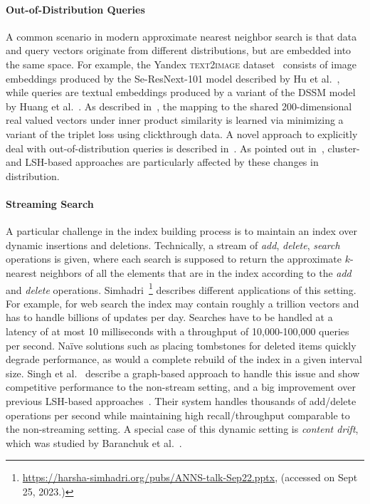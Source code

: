 \documentclass[11pt]{article}
\begin{document}
\paragraph{Out-of-Distribution Queries}
A common scenario in modern approximate nearest neighbor search is that data and query vectors originate from different distributions, but are embedded into the same space.
For example, the Yandex \textsc{text2image} dataset~\cite{DBLP:conf/nips/SimhadriWADBBCH21} consists of image embeddings produced by the Se-ResNext-101 model described by Hu et al.~\cite{DBLP:conf/cvpr/HuSS18}, while queries are textual embeddings produced by a variant of the DSSM model by Huang et al.~\cite{DBLP:conf/cikm/HuangHGDAH13}.
As described in~\cite{DBLP:conf/nips/SimhadriWADBBCH21}, the mapping to the shared 200-dimensional real valued vectors under inner product similarity is learned via minimizing a variant of the triplet loss using clickthrough data.
A novel approach to explicitly deal with out-of-distribution queries is described in~\cite{DBLP:journals/corr/abs-2211-12850-ood}.
As pointed out in~\cite{DBLP:journals/corr/abs-2305-04359}, cluster- and LSH-based approaches are particularly affected by these changes in distribution.


\paragraph{Streaming Search}
A particular challenge in the index building process is to maintain an index over dynamic insertions and deletions.
Technically, a stream of \emph{add}, \emph{delete}, \emph{search} operations is given, where each search is supposed to return the approximate $k$-nearest neighbors of all the elements that are in the index according to the \emph{add} and \emph{delete} operations.
Simhadri~\footnote{\url{https://harsha-simhadri.org/pubs/ANNS-talk-Sep22.pptx}, (accessed on Sept 25, 2023.)} describes different applications of this setting.
For example, for web search the index may contain roughly a trillion vectors and has to handle billions of updates per day.
Searches have to be handled at a latency of at most 10 milliseconds with a throughput of 10,000-100,000 queries per second.
Naïve solutions such as placing tombstones for deleted items quickly degrade performance, as would a complete rebuild of the index in a given interval size.
Singh et al.~\cite{DBLP:journals/corr/abs-2105-09613-stream} describe a graph-based approach to handle this issue and show competitive performance to the non-stream setting, and a big improvement over previous LSH-based approaches~\cite{DBLP:journals/pvldb/SundaramTSMIMD13}.
Their system handles thousands of add/delete operations per second while maintaining high recall/throughput comparable to the non-streaming setting.
A special case of this dynamic setting is \emph{content drift}, which was studied by Baranchuk et al.~\cite{DBLP:journals/corr/abs-2308-02752-drift}.
\end{document}
